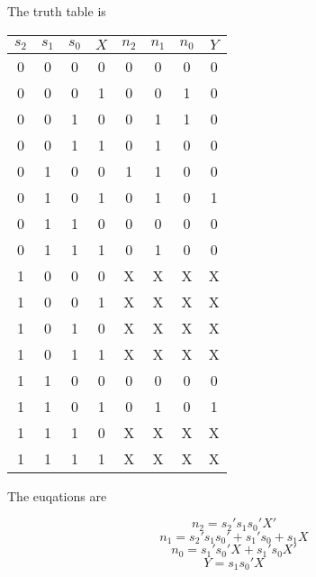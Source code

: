 The truth table is 

\begin{center}
\begin{tabular}{cccc|cccc}
$s_{2}$ & $s_{1}$ & $s_{0}$ & $X$ & $n_{2}$ & $n_{1}$ & $n_{0}$ & $Y$ \\
\hline
0 & 0 & 0 & 0 & 0 & 0 & 0 & 0 \\
0 & 0 & 0 & 1 & 0 & 0 & 1 & 0 \\
0 & 0 & 1 & 0 & 0 & 1 & 1 & 0 \\
0 & 0 & 1 & 1 & 0 & 1 & 0 & 0 \\
0 & 1 & 0 & 0 & 1 & 1 & 0 & 0 \\
0 & 1 & 0 & 1 & 0 & 1 & 0 & 1 \\
0 & 1 & 1 & 0 & 0 & 0 & 0 & 0 \\
0 & 1 & 1 & 1 & 0 & 1 & 0 & 0 \\
1 & 0 & 0 & 0 & X & X & X & X \\
1 & 0 & 0 & 1 & X & X & X & X \\
1 & 0 & 1 & 0 & X & X & X & X \\
1 & 0 & 1 & 1 & X & X & X & X \\
1 & 1 & 0 & 0 & 0 & 0 & 0 & 0 \\
1 & 1 & 0 & 1 & 0 & 1 & 0 & 1 \\
1 & 1 & 1 & 0 & X & X & X & X \\
1 & 1 & 1 & 1 & X & X & X & X \\
\end{tabular}
\end{center}

The euqations are 

$$n_{2}=s_{2}'s_{1}s_{0}'X'$$
$$n_{1}=s_{2}'s_{1}s_{0}'+s_{1}'s_{0}+s_{1}X$$
$$n_{0}=s_{1}'s_{0}'X+s_{1}'s_{0}X'$$
$$Y=s_{1}s_{0}'X$$


